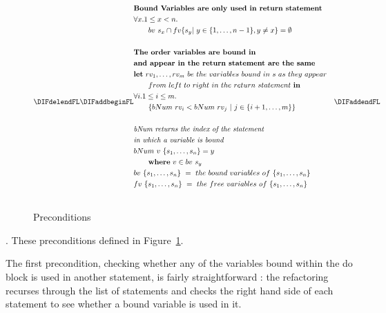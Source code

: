\begin{figure}[t]
\begin{math}
\DIFdelendFL \DIFaddbeginFL \begin{aligned}  	
&\textbf{Bound Variables are only used in return statement}\\
&\forall x.1\leq x < n.&\\
&\qquad bv\ s_x \cap fv \{s_y |\ y \in \{1, \ldots, n-1\}, y \neq x\} = \emptyset \\
\\
&\textbf{The order variables are bound in}\\
&\textbf{and appear in the return statement are the same}\\
&\textbf{let}\ rv_1, \ldots, rv_m\ be\ the\ variables\ bound\ in\ s\ as\ they\ appear&\\
&\qquad from\ left\ to\ right\ in\ the\ return\ statement\ \textbf{in}&\\
&\forall i. 1 \leq i \leq m .&\\
&\qquad \{bNum\ rv_i < bNum\ rv_j\ |\ j \in \{i+1, \ldots, m\} \}&\\
\\
&\textit{bNum returns the index of the statement}\\ 
&\textit{in which a variable is bound}\\
&bNum\ v\ \{s_1, \ldots, s_n \} = y &\\
&\qquad \textbf{where}\ v \in bv\ s_y&\\ 
&bv\ \{s_1, \ldots, s_n \}\ =\ the\ bound\ variables\ of\ \{s_1, \ldots, s_n\}\\
&fv\ \{s_1, \ldots, s_n \}\ =\ the\ free\ variables\ of\ \{s_1, \ldots, s_n\}\\&
		\end{aligned}
	\DIFaddendFL \end{math}
	\caption{Preconditions}
	\label{preconditions}
\end{figure}

\DIFdelbegin {}\DIFdelend \DIFaddbegin {}\DIFaddend . These preconditions \DIFdelbegin {}\DIFdelend \DIFaddbegin {}\DIFaddend defined in Figure~\ref{preconditions}. 

The first precondition, checking whether any of the variables bound within the do block is used in another statement, is fairly straightforward \DIFaddbegin {}\DIFaddend : the refactoring \DIFdelbegin {}\DIFdelend recurses through the list of statements and checks the right hand side of each statement to see whether a bound variable is used in it. \DIFaddbegin {}\DIFaddend 


